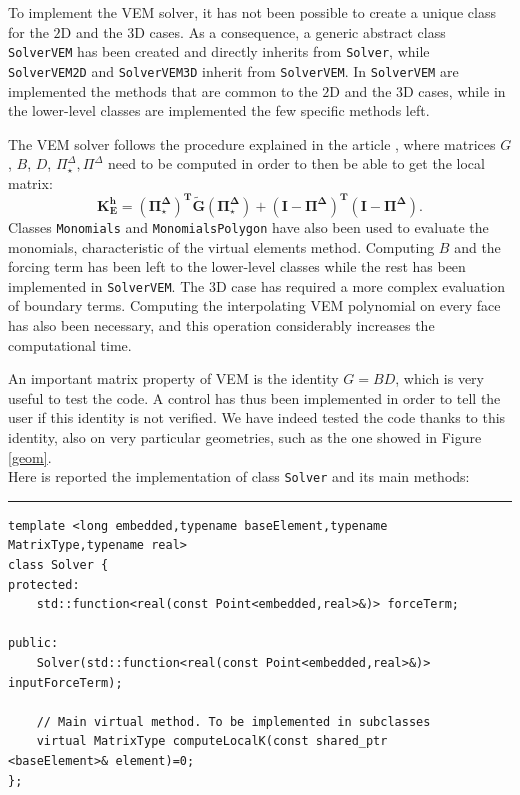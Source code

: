 To implement the VEM solver, it has not been possible to create a unique class for the $2$D and the $3$D cases. As a consequence, a generic abstract class \verb|SolverVEM| has been created and directly inherits from \verb|Solver|, while \verb|SolverVEM2D| and \verb|SolverVEM3D| inherit from \verb|SolverVEM|. In \verb|SolverVEM| are implemented the methods that are common to the $2$D and the $3$D cases, while in the lower-level classes are implemented the few specific methods left. 

The VEM solver follows the procedure explained in the article \cite{hitchhicker}, where matrices $G$, $B$, $D$, $\Pi_\star^\Delta,\Pi^\Delta$ need to be computed in order to then be able to get the local matrix:
$$ \mathbf{K_E^h= (\Pi^\Delta_\star)^T \tilde{G}
  (\Pi^\Delta_\star)+(I-\Pi^\Delta)^T (I-\Pi^\Delta)}. $$ 
Classes \verb|Monomials| and \verb|MonomialsPolygon| have also been used to evaluate the monomials, characteristic of the virtual elements method. Computing $B$ and the forcing term has been left to the lower-level classes while the rest has been implemented in \verb|SolverVEM|. The $3$D case has required a more complex evaluation of boundary terms. Computing the interpolating VEM polynomial on every face has also been necessary, and this operation considerably increases the computational time. 

An important matrix property of VEM is the identity $G = BD$, which is very useful to test the code. A control has thus been implemented in order to tell the user if this identity is not verified. We have indeed tested the code thanks to this identity, also on very particular geometries, such as the one showed in Figure \ref{geom}. \\

Here is reported the implementation of class \verb|Solver| and its main methods:

\noindent\rule{16cm}{1pt}
\begin{lstlisting}[caption=File \texttt{Solver.h}]
template <long embedded,typename baseElement,typename 
MatrixType,typename real>
class Solver {
protected:
    std::function<real(const Point<embedded,real>&)> forceTerm;
	
public:
    Solver(std::function<real(const Point<embedded,real>&)> 
inputForceTerm);

    // Main virtual method. To be implemented in subclasses
    virtual MatrixType computeLocalK(const shared_ptr
<baseElement>& element)=0;
};
\end{lstlisting}

